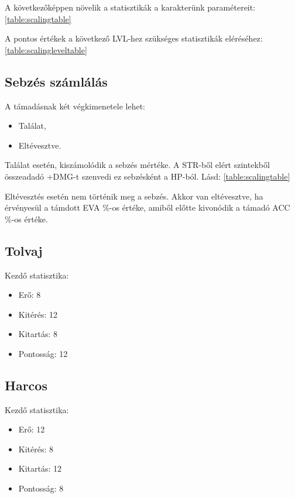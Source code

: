 \noindent A következőképpen növelik a statisztikák a karakterünk paramétereit: \ref{table:scalingtable}

\noindent A pontos értékek a következő LVL-hez szükséges statisztikák eléréséhez: \ref{table:scalingleveltable}

\subsection{Sebzés számlálás}

A támadásnak két végkimenetele lehet:

\begin{itemize}
    \item Találat,
    \item Eltévesztve.
\end{itemize}

\noindent Találat esetén, kiszámolódik a sebzés mértéke. A STR-ből elért szintekből összeadadó +DMG-t szenvedi ez sebzésként a HP-ból. Lásd: \ref{table:scalingtable}

\noindent Eltévesztés esetén nem történik meg a sebzés. Akkor van eltévesztve, ha érvényesül a támdott EVA \%-os értéke, amiből előtte kivonódik a támadó ACC \%-os értéke.


\subsection{Tolvaj}

\noindent Kezdő statisztika:
\begin{itemize}
    \item Erő: 8
    \item Kitérés: 12
    \item Kitartás: 8
    \item Pontosság: 12
\end{itemize}

\subsection{Harcos}

\noindent Kezdő statisztika:
\begin{itemize}
    \item Erő: 12
    \item Kitérés: 8
    \item Kitartás: 12
    \item Pontosság: 8
\end{itemize}

